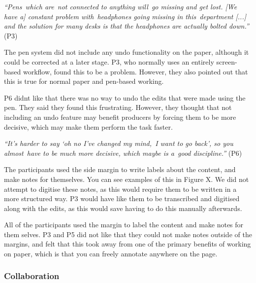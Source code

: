 \textit{``Pens which are not connected to anything will go missing and get lost.
  [We have a] constant problem with headphones going missing in this department [...]
  and the solution for many desks is that the headphones are actually bolted down.''} (P3)





The pen system did not include any undo functionality on the paper, although it could be corrected at a later stage.
P3, who normally uses an entirely screen-based workflow, found this to be a problem. However, they also pointed out
that this is true for normal paper and pen-based working.

P6 didnt like that there was no way to undo the edits that were made using the pen. They said they found this
frustrating. However, they thought that not including an undo feature may benefit producers by forcing them to be more
decisive, which may make them perform the task faster.

\textit{``It's harder to say `oh no I've changed my mind, I want to go back', so you almost have to be much more
decisive, which maybe is a good discipline.''} (P6)


The participants used the side margin to write labels about the content, and make notes for themselves. You can see
examples of this in Figure X. We did not attempt to digitise these notes, as this would require them to be written in a
more structured way. P3 would have like them to be transcribed and digitised along with the edits, as this would save
having to do this manually afterwards.

All of the participants used the margin to label the content and make notes for them selves. P3 and P5 did not like
that they could not make notes outside of the margins, and felt that this took away from one of the primary benefits of
working on paper, which is that you can freely annotate anywhere on the page.

\subsubsection{Collaboration}

